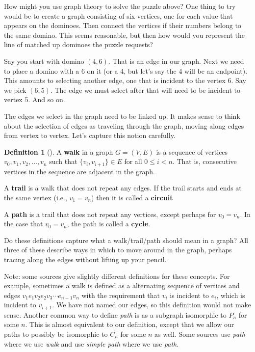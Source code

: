 \documentclass[10pt,]{book}
\newcommand{\terminology}[1]{\textbf{#1}}
\theoremstyle{plain}
\theoremstyle{definition}
\newtheorem{definition}[theorem]{Definition}
\theoremstyle{definition}
\theoremstyle{definition}
\numberwithin{equation}{chapter}
\newcommand{\lt}{<}
\begin{document}
\hypertarget{p-1360}{}%
How might you use graph theory to solve the puzzle above?  One thing to try would be to create a graph consisting of six vertices, one for each value that appears on the dominoes.  Then connect the vertices if their numbers belong to the same domino.  This seems reasonable, but then how would you represent the line of matched up dominoes the puzzle requests?%
\par
\hypertarget{p-1361}{}%
Say you start with domino \((4,6)\).  That is an edge in our graph.  Next we need to place a domino with a 6 on it (or a 4, but let's say the 4 will be an endpoint).  This amounts to selecting another edge, one that is incident to the vertex 6.  Say we pick \((6,5)\).  The edge we must select after that will need to be incident to vertex 5.  And so on.%
\par
\hypertarget{p-1362}{}%
The edges we select in the graph need to be linked up.  It makes sense to think about the selection of edges as traveling through the graph, moving along edges from vertex to vertex.  Let's capture this notion carefully.%
\begin{definition}[{}]\label{def-walk}
\hypertarget{p-1363}{}%
A \terminology{walk} in a graph \(G = (V,E)\) is a sequence of vertices \(v_0, v_1, v_2, \ldots, v_n\) such that \(\{v_i, v_{i+1}\} \in E\) for all \(0 \le i \lt n\).  That is, consecutive vertices in the sequence are adjacent in the graph.%
\par
\hypertarget{p-1364}{}%
A \terminology{trail} is a walk that does not repeat any edges.  If the trail starts and ends at the same vertex (i.e., \(v_1 = v_n\)) then it is called a \terminology{circuit}%
\par
\hypertarget{p-1365}{}%
A \terminology{path} is a trail that does not repeat any vertices, except perhaps for \(v_0 = v_n\).  In the case that \(v_0 = v_n\), the path is called a \terminology{cycle}.%
\end{definition}
\hypertarget{p-1366}{}%
Do these definitions capture what a walk/trail/path should mean in a graph?  All three of these describe ways in which to move around in the graph, perhaps tracing along the edges without lifting up your pencil.%
\par
\hypertarget{p-1367}{}%
Note: some sources give slightly different definitions for these concepts.  For example, sometimes a walk is defined as a alternating sequence of vertices and edges \(v_1e_1v_2e_2v_3\cdots e_{n-1}v_n\) with the requirement that \(v_i\) is incident to \(e_i\), which is incident to \(v_{i+1}\).  We have not named our edges, so this definition would not make sense.  Another common way to define \emph{path} is as a subgraph isomorphic to \(P_n\) for some \(n\).  This is almost equivalent to our definition, except that we allow our paths to possibly be isomorphic to \(C_n\) for some \(n\) as well.  Some sources use \emph{path} where we use \emph{walk} and use \emph{simple path} where we use \emph{path}.%
\end{document}
